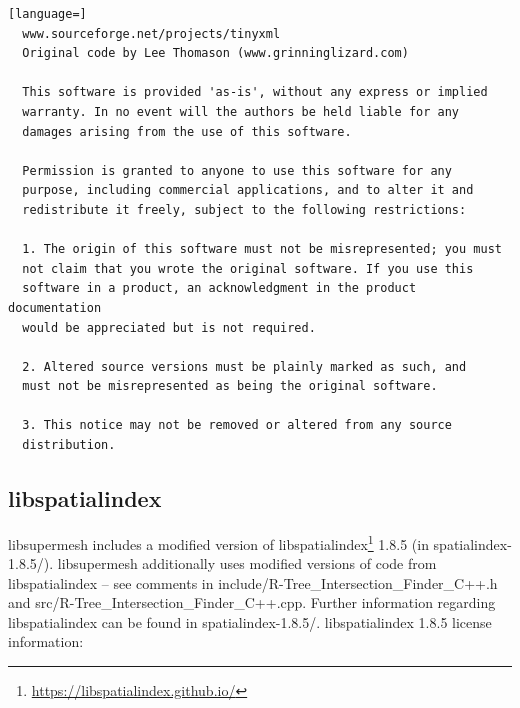 \documentclass{article}
\begin{document}
\begin{lstlisting}[language=]
  www.sourceforge.net/projects/tinyxml
  Original code by Lee Thomason (www.grinninglizard.com)

  This software is provided 'as-is', without any express or implied
  warranty. In no event will the authors be held liable for any
  damages arising from the use of this software.

  Permission is granted to anyone to use this software for any
  purpose, including commercial applications, and to alter it and
  redistribute it freely, subject to the following restrictions:

  1. The origin of this software must not be misrepresented; you must
  not claim that you wrote the original software. If you use this
  software in a product, an acknowledgment in the product documentation
  would be appreciated but is not required.

  2. Altered source versions must be plainly marked as such, and
  must not be misrepresented as being the original software.

  3. This notice may not be removed or altered from any source
  distribution.
\end{lstlisting}

\subsection{libspatialindex}

libsupermesh includes a modified version of
libspatialindex\footnote{\url{https://libspatialindex.github.io/}} 1.8.5
(in spatialindex-1.8.5/). libsupermesh additionally uses modified versions of
code from libspatialindex -- see comments in \linebreak
include/R-Tree\_Intersection\_Finder\_C++.h and
src/R-Tree\_Intersection\_Finder\_C++.cpp. Further information regarding
libspatialindex can be found in spatialindex-1.8.5/. libspatialindex 1.8.5
license information:
\end{document}

